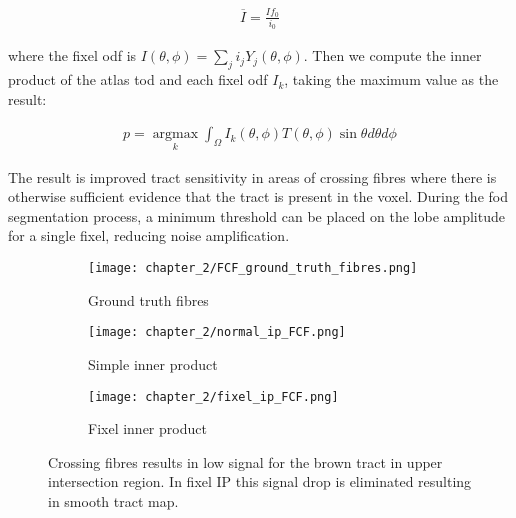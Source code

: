 \begin{align}
  \overline{I} = \frac{I f_0}{i_0}
\end{align}

where the fixel \gls{odf} is $I(\theta, \phi) = \sum_j i_j Y_j(\theta,\phi)$.
Then we compute the inner product of the atlas \gls{tod} and each fixel \gls{odf} $I_k$, taking the maximum value as the result:

\begin{align}
  p = \operatorname*{argmax}_k \int_\Omega I_k(\theta,\phi) T(\theta,\phi) \sin\theta d\theta d\phi
\end{align}

The result is improved tract sensitivity in areas of crossing fibres where there is otherwise sufficient evidence that the tract is present in the voxel.
During the \gls{fod} segmentation process, a minimum threshold can be placed on the lobe amplitude for a single fixel, reducing noise amplification.

\begin{figure}
  \centering
  \begin{subfigure}[b]{0.3\textwidth}
  \centering
  \texttt{[image: chapter\_2/FCF\_ground\_truth\_fibres.png]}
  \caption{Ground truth fibres}
  \end{subfigure}%
  \begin{subfigure}[b]{0.3\textwidth}
  \texttt{[image: chapter\_2/normal\_ip\_FCF.png]}
  \caption{Simple inner product}
  \end{subfigure}%
  \begin{subfigure}[b]{0.3\textwidth}
  \texttt{[image: chapter\_2/fixel\_ip\_FCF.png]}
  \caption{Fixel inner product}
  \end{subfigure}
  \caption{Crossing fibres results in low signal for the brown tract in upper intersection region. In fixel IP this signal drop is eliminated resulting in smooth tract map.}\label{fig:fixip}
\end{figure}

